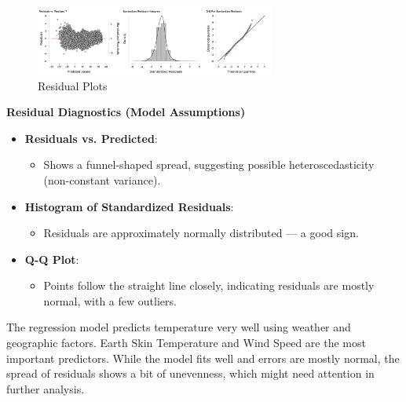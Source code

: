\begin{figure}[h]
\centering
\includegraphics[width=0.7\textwidth]{figures/regression_plot.png}
\caption{Residual Plots}
\end{figure}

\textbf{Residual Diagnostics (Model Assumptions)}
    \begin{itemize}
        \item \textbf{Residuals vs. Predicted}:
        \begin{itemize}
            \item Shows a funnel-shaped spread, suggesting possible heteroscedasticity (non-constant variance).
        \end{itemize}
        \item \textbf{Histogram of Standardized Residuals}:
        \begin{itemize}
            \item Residuals are approximately normally distributed — a good sign.
        \end{itemize}
        \item \textbf{Q-Q Plot}:
        \begin{itemize}
            \item Points follow the straight line closely, indicating residuals are mostly normal, with a few outliers.
        \end{itemize}
    \end{itemize}

The regression model predicts temperature very well using weather and geographic factors. Earth Skin Temperature and Wind Speed are the most important predictors. While the model fits well and errors are mostly normal, the spread of residuals shows a bit of unevenness, which might need attention in further analysis.

